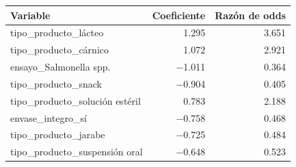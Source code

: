\begin{tabular}{lrr}
\toprule
Variable & Coeficiente & Razón de odds \\
\midrule
tipo\_producto\_lácteo & 1.295 & 3.651 \\
tipo\_producto\_cárnico & 1.072 & 2.921 \\
ensayo\_Salmonella spp. & $-$1.011 & 0.364 \\
tipo\_producto\_snack & $-$0.904 & 0.405 \\
tipo\_producto\_solución estéril & 0.783 & 2.188 \\
envase\_integro\_sí & $-$0.758 & 0.468 \\
tipo\_producto\_jarabe & $-$0.725 & 0.484 \\
tipo\_producto\_suspensión oral & $-$0.648 & 0.523 \\
\bottomrule
\end{tabular}
